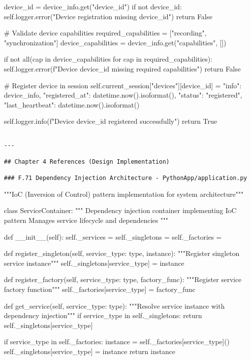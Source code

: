 \documentclass[12pt,a4paper]{report}
\begin{document}
    device\_id = device\_info.get("device\_id")
    if not device\_id:
        self.logger.error("Device registration missing device\_id")
        return False

    \# Validate device capabilities
    required\_capabilities = ["recording", "synchronization"]
    device\_capabilities = device\_info.get("capabilities", [])

    if not all(cap in device\_capabilities for cap in required\_capabilities):
        self.logger.error(f"Device {device\_id} missing required capabilities")
        return False

    \# Register device in session
    self.current\_session["devices"][device\_id] = {
        "info": device\_info,
        "registered\_at": datetime.now().isoformat(),
        "status": "registered",
        "last\_heartbeat": datetime.now().isoformat()
    }

    self.logger.info(f"Device {device\_id} registered successfully")
    return True
\begin{verbatim}

---

## Chapter 4 References (Design Implementation)

### F.71 Dependency Injection Architecture - PythonApp/application.py

\end{verbatim}
"""IoC (Inversion of Control) pattern implementation for system architecture"""


class ServiceContainer:
    """
    Dependency injection container implementing IoC pattern
    Manages service lifecycle and dependencies
    """

    def \_\_init\_\_(self):
        self.\_services = {}
        self.\_singletons = {}
        self.\_factories = {}

    def register\_singleton(self, service\_type: type, instance):
        """Register singleton service instance"""
        self.\_singletons[service\_type] = instance

    def register\_factory(self, service\_type: type, factory\_func):
        """Register service factory function"""
        self.\_factories[service\_type] = factory\_func

    def get\_service(self, service\_type: type):
        """Resolve service instance with dependency injection"""
        if service\_type in self.\_singletons:
            return self.\_singletons[service\_type]

        if service\_type in self.\_factories:
            instance = self.\_factories[service\_type]()
            self.\_singletons[service\_type] = instance
            return instance
\end{document}
